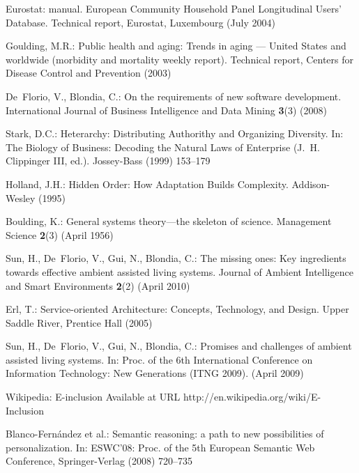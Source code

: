 \documentclass{llncs}
\begin{document}
\begin{thebibliography}{10}

Eurostat:
 manual. {European Community Household Panel Longitudinal
  Users' Database}.
\newblock Technical report, Eurostat, Luxembourg (July 2004)

Goulding, M.R.:
\newblock Public health and aging: Trends in aging --- {United States} and
  worldwide (morbidity and mortality weekly report).
\newblock Technical report, Centers for Disease Control and Prevention (2003)

De~Florio, V., Blondia, C.:
\newblock On the requirements of new software development.
\newblock International Journal of Business Intelligence and Data Mining
  \textbf{3}(3) (2008)

Stark, D.C.:
\newblock Heterarchy: Distributing Authorithy and Organizing Diversity.
\newblock In: The Biology of Business: Decoding the Natural Laws of Enterprise
  (J.~H. Clippinger III, ed.). Jossey-Bass (1999)  153--179

Holland, J.H.:
\newblock Hidden Order: How Adaptation Builds Complexity.
\newblock Addison-Wesley (1995)

Boulding, K.:
\newblock General systems theory---the skeleton of science.
\newblock Management Science \textbf{2}(3) (April 1956)

Sun, H., De~Florio, V., Gui, N., Blondia, C.:
\newblock The missing ones: Key ingredients towards effective ambient assisted
  living systems.
\newblock Journal of Ambient Intelligence and Smart Environments \textbf{2}(2)
  (April 2010)

Erl, T.:
\newblock Service-oriented Architecture: Concepts, Technology, and Design.
\newblock Upper Saddle River, Prentice Hall (2005)

Sun, H., De~Florio, V., Gui, N., Blondia, C.:
\newblock Promises and challenges of ambient assisted living systems.
\newblock In: Proc. of the 6th International Conference on Information
  Technology: New Generations (ITNG 2009). (April 2009)

Wikipedia:
\newblock E-inclusion
\newblock Available at URL http://en.wikipedia.org/wiki/E-Inclusion

Blanco-Fern\'{a}ndez et al.:
\newblock Semantic reasoning: a path to new possibilities of personalization.
\newblock In: ESWC'08: Proc. of the 5th European Semantic Web Conference,
  Springer-Verlag (2008)  720--735


\end{thebibliography}
\end{document}
